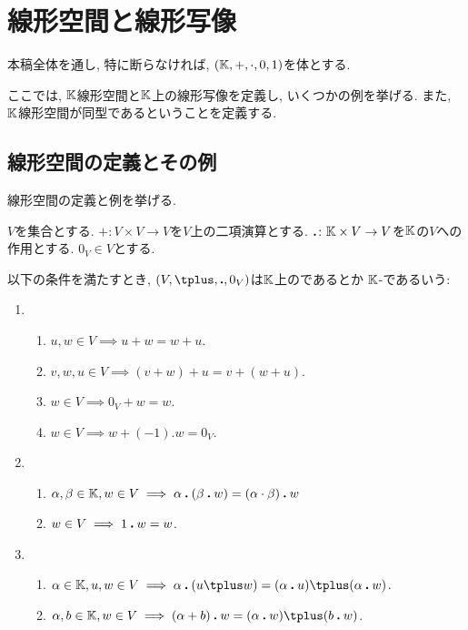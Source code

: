 \chapter{線形空間と線形写像}
\label{chap:linspace:linmap}
本稿全体を通し,
特に断らなければ,
$(\mathbb{K},+,\cdot,0,1)$を体とする.

ここでは, $\mathbb{K}$線形空間と$\mathbb{K}$上の線形写像を定義し,
いくつかの例を挙げる.
また, $\mathbb{K}$線形空間が同型であるということを定義する.

\section{線形空間の定義とその例}
\label{sec:linspace:def}

線形空間の定義と例を挙げる.

\begin{definition}
\label{def:vecsp}
  $V$を集合とする.
  $\plus\colon V\times V \to V$を$V$上の二項演算とする.
  $\mathbin{\boldsymbol{.}} \colon \mathbb{K}\times V \to V$を$\mathbb{K}$の$V$への作用とする.
  $0_V \in V$とする.

  以下の条件を満たすとき,
  $(V,\plus,\act ,0_V)$は$\mathbb{K}$上のであるとか
  $\mathbb{K}$-であるいう:
  \begin{enumerate}
  \item 
    \begin{enumerate}
    \item $u,w \in V\implies  u\plus w=w\plus u$.
    \item
      \label{def:vecsp:item:sum:ass}
      $v,w,u\in V \implies (v\plus w)\plus u=v\plus (w\plus u)$.
    \item $w\in V \implies 0_V\plus w=w$.
    \item $w\in V\implies w\plus (-1).w=0_V$.%
    \end{enumerate}
  \item
    \begin{enumerate}
    \item
      \label{def:vecsp:item:prod:ass}
      $\alpha,\beta\in\mathbb{K}, w\in V \implies \alpha\mathbin{\boldsymbol{.}} (\beta \mathbin{\boldsymbol{.}} w)=(\alpha\cdot \beta)\mathbin{\boldsymbol{.}} w$
    \item $w\in V \implies 1\mathbin{\boldsymbol{.}} w=w$.
    \end{enumerate}
  \item
    \begin{enumerate}
    \item
      \label{def:vecsp:item:dist:r}
$\alpha\in \KK,u,w\in V \implies \alpha\act (u\plus w)=(\alpha\act u)\plus (\alpha\act w)$.
    \item
      \label{def:vecsp:item:dist:l}
$\alpha,b\in\KK, w\in V\implies (\alpha+b)\act w=(\alpha\act w)\plus (b\act w)$.
    \end{enumerate}
  \end{enumerate}
\end{definition}
